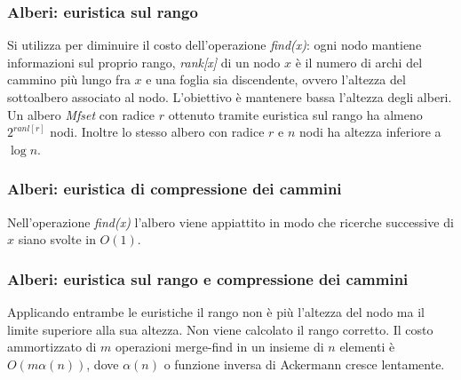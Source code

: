 \subsubsection{Alberi: euristica sul rango}
Si utilizza per diminuire il costo dell'operazione \emph{find(x)}: ogni nodo mantiene informazioni sul proprio rango, \emph{rank[x]} di un nodo $x$ \`e il numero di archi del cammino pi\`u lungo fra $x$ e una 
foglia sia discendente, ovvero l'altezza del sottoalbero associato al nodo. L'obiettivo \`e mantenere bassa l'altezza degli alberi. Un albero \emph{Mfset} con radice $r$ ottenuto tramite euristica sul
rango ha almeno $2^{ranl[r]}$ nodi. Inoltre lo stesso albero con radice $r$ e $n$ nodi ha altezza inferiore a $\log n$. 
\begin{multicols}{2}

\columnbreak

\end{multicols}
\subsubsection{Alberi: euristica di compressione dei cammini}
\begin{multicols}{2}
Nell'operazione \emph{find(x)} l'albero viene appiattito in modo che ricerche successive di $x$ siano svolte in $O(1)$.

\end{multicols}
\subsubsection{Alberi: euristica sul rango e compressione dei cammini}
Applicando entrambe le euristiche il rango non \`e pi\`u l'altezza del nodo ma il limite superiore alla sua altezza. Non viene calcolato il rango corretto. Il costo ammortizzato di $m$ operazioni merge-find in un 
insieme di $n$ elementi \`e $O(m\alpha(n))$, dove $\alpha(n)$ o funzione inversa di Ackermann cresce lentamente. 
